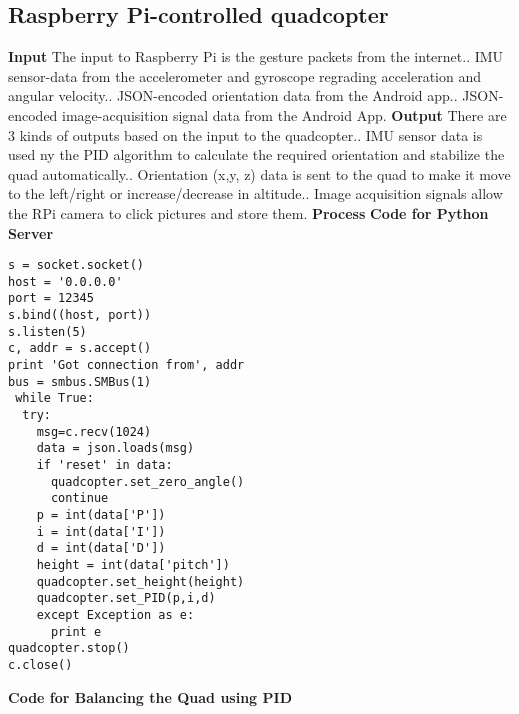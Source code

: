 \subsection{Raspberry Pi-controlled quadcopter}
\textbf{Input}\newline
The input to Raspberry Pi is the gesture packets from the internet.. IMU sensor-data from the accelerometer and gyroscope regrading acceleration and angular velocity.. JSON-encoded orientation data from the Android app.. JSON-encoded image-acquisition signal data from the Android App.\newline
\textbf{Output}\newline
There are 3 kinds of outputs based on the input to the quadcopter.. IMU sensor data is used ny the PID algorithm to calculate the required orientation and stabilize the quad automatically.. Orientation (x,y, z) data is sent to the quad to make it move to the left/right or increase/decrease in altitude.. Image acquisition signals allow the RPi camera to click pictures and store them.\newline
\textbf{Process}\newline
\textbf{Code for Python Server}\newline
\begin{lstlisting}
s = socket.socket()       
host = '0.0.0.0'      
port = 12345          
s.bind((host, port)) 
s.listen(5)          
c, addr = s.accept() 
print 'Got connection from', addr
bus = smbus.SMBus(1)
 while True:
  try:
    msg=c.recv(1024)
    data = json.loads(msg)
    if 'reset' in data:
      quadcopter.set_zero_angle()
      continue
    p = int(data['P'])
    i = int(data['I'])
    d = int(data['D'])
    height = int(data['pitch'])
    quadcopter.set_height(height)
    quadcopter.set_PID(p,i,d)
    except Exception as e:
      print e
quadcopter.stop()
c.close()      
\end{lstlisting} 
\textbf{Code for Balancing the Quad using PID}\newline
